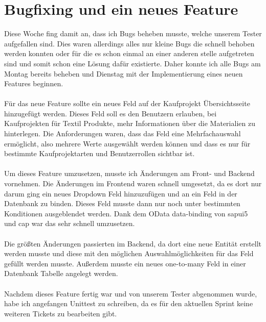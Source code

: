 \section{Bugfixing und ein neues Feature}
Diese Woche fing damit an, dass ich Bugs beheben musste, welche unserem Tester aufgefallen sind. Dies waren allerdings alles nur kleine Bugs die schnell behoben werden konnten oder für die es schon einmal an einer anderen stelle aufgetreten sind und somit schon eine Lösung dafür existierte. Daher konnte ich alle Bugs am Montag bereits beheben und Dienstag mit der Implementierung eines neuen Features beginnen. \\\\
Für das neue Feature sollte ein neues Feld auf der Kaufprojekt Übersichtsseite hinzugefügt werden. Dieses Feld soll es den Benutzern erlauben, bei Kaufprojekten für Textil Produkte, mehr Informationen über die Materialien zu hinterlegen. Die Anforderungen waren, dass das Feld eine Mehrfachauswahl ermöglicht, also mehrere Werte ausgewählt werden können und dass es nur für bestimmte Kaufprojektarten und Benutzerrollen sichtbar ist. \\\\
Um dieses Feature umzusetzen, musste ich Änderungen am Front- und Backend vornehmen. Die Änderungen im Frontend waren schnell umgesetzt, da es dort nur darum ging ein neues Dropdown Feld hinzuzufügen und an ein Feld in der Datenbank zu binden. Dieses Feld musste dann nur noch unter bestimmten Konditionen ausgeblendet werden. Dank dem OData data-binding von \acs{sapui5} und \acs{cap} war das sehr schnell umzusetzen. \\\\
Die größten Änderungen passierten im Backend, da dort eine neue Entität erstellt werden musste und diese mit den möglichen Auswahlmöglichkeiten für das Feld gefüllt werden musste. Außerdem musste ein neues one-to-many Feld in einer Datenbank Tabelle angelegt werden. \\\\
Nachdem dieses Feature fertig war und von unserem Tester abgenommen wurde, habe ich angefangen Unittest zu schreiben, da es für den aktuellen Sprint keine weiteren Tickets zu bearbeiten gibt. \\\\

